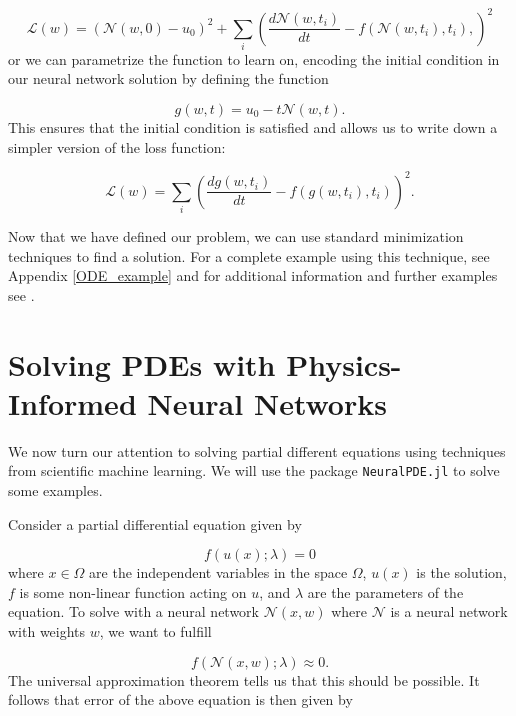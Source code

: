 \documentclass{CUP-JNL-DTM}%
\theoremstyle{definition}
\numberwithin{equation}{section}
\newcommand{\loss}{\mathcal{L}}
\newcommand{\net}{\mathcal{N}}
\begin{document}
\begin{equation}
	\loss(w) = (\net(w,0) - u_0)^2 + \sum_i \left( \frac{d\net(w,t_i)}{dt} - f(\net(w,t_i), t_i),\right)^2
\end{equation}
or we can parametrize the function to learn on, encoding the initial condition in our neural network solution by defining the function 

\begin{equation}
	g(w,t) = u_0 - t\net(w,t).
\end{equation}
This ensures that the initial condition is satisfied and allows us to write down a simpler version of the loss function:

\begin{equation}
	\loss(w) = \sum_i \left(\frac{dg(w,t_i)}{dt} - f(g(w,t_i), t_i)\right)^2. 
\end{equation}

Now that we have defined our problem, we can use standard minimization techniques to find a solution. For a complete example using this technique, see Appendix \ref{ODE_example} and for additional information and further examples see \cite{rackauckasSciMLSciMLBookParallel}. 


\section{Solving PDEs with Physics-Informed Neural Networks}
\label{sec:PDE}

We now turn our attention to solving partial different equations using techniques from scientific machine learning. We will use the package \texttt{NeuralPDE.jl} \cite{zubovNeuralPDEAutomatingPhysicsInformed2021} to solve some examples. 

Consider a partial differential equation given by 

\begin{equation}
	f(u(x); \lambda) = 0
\end{equation}
where $x \in \Omega$ are the independent variables in the space $\Omega$, $u(x)$ is the solution, $f$ is some non-linear function acting on $u$, and $\lambda$ are the parameters of the equation. To solve with a neural network $\net(x, w)$ where $\net$ is a neural network with weights $w$, we want to fulfill 

\begin{equation}
	f(\net(x, w); \lambda) \approx 0.
	\label{eqn:NNapprox}
\end{equation}
The universal approximation theorem tells us that this should be possible. It follows that error of the above equation is then given by 
\end{document}
